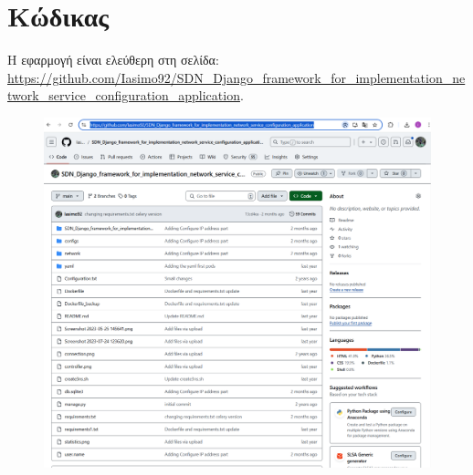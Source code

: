 \section{Κώδικας}

H εφαρμογή είναι ελεύθερη στη σελίδα:  \url{https://github.com/Iasimo92/SDN_Django_framework_for_implementation_network_service_configuration_application}. 


\FloatBarrier

\begin{figure}[h]
	\centering
	\includegraphics[width=1.1\textwidth]{graphics/github_page.png}
	\caption{}
\end{figure}

\FloatBarrier

